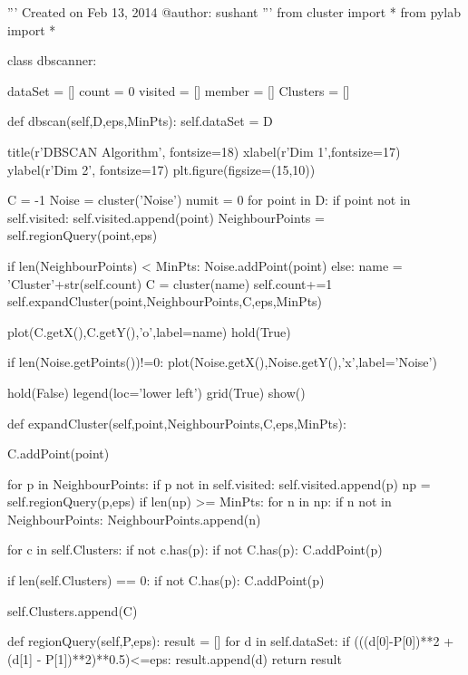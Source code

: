 \documentclass[a4paper, 12pt, spanish]{article}
\renewcommand*{\listalgorithmname}{\'Indice de algoritmos}
\begin{document}
\pagebreak
\begin{python}[caption=DBSCAN]\label{App:DBSCAN}
'''
Created on Feb 13, 2014
@author: sushant
'''
from cluster import *
from pylab import *

class dbscanner:
    
	dataSet = []
	count = 0
	visited = []
	member = []
	Clusters = []
    
	def dbscan(self,D,eps,MinPts):
		self.dataSet = D
        
		title(r'DBSCAN Algorithm', fontsize=18)
		xlabel(r'Dim 1',fontsize=17)
		ylabel(r'Dim 2', fontsize=17)
		plt.figure(figsize=(15,10))
        
		C = -1
		Noise = cluster('Noise')
		numit = 0
		for point in D:
			if point not in self.visited:
				self.visited.append(point)
				NeighbourPoints = self.regionQuery(point,eps)
                
				if len(NeighbourPoints) < MinPts:
					Noise.addPoint(point)
				else:
					name = 'Cluster'+str(self.count)
					C = cluster(name)
					self.count+=1
					self.expandCluster(point,NeighbourPoints,C,eps,MinPts)
                    
					plot(C.getX(),C.getY(),'o',label=name)
					hold(True)

       
		if len(Noise.getPoints())!=0:
			plot(Noise.getX(),Noise.getY(),'x',label='Noise')
            
		hold(False)
		legend(loc='lower left')
		grid(True)
		show()
    
	def expandCluster(self,point,NeighbourPoints,C,eps,MinPts):
        
		C.addPoint(point)
        
		for p in NeighbourPoints:
			if p not in self.visited:
				self.visited.append(p)
				np = self.regionQuery(p,eps)
				if len(np) >= MinPts:
					for n in np:
						if n not in NeighbourPoints:
							NeighbourPoints.append(n)
                    
			for c in self.Clusters:
				if not c.has(p):
					if not C.has(p):
						C.addPoint(p)
                        
			if len(self.Clusters) == 0:
				if not C.has(p):
					C.addPoint(p)
                        
		self.Clusters.append(C)                 
                
                     
	def regionQuery(self,P,eps):
		result = []
		for d in self.dataSet:
			if (((d[0]-P[0])**2 + (d[1] - P[1])**2)**0.5)<=eps:
				result.append(d)
		return result            
    
\end{python}

\newpage
{}
\listoffigures
\addcontentsline{toc}{section}{\listalgorithmname}
\listofalgorithms

\newpage
{}

{}

\end{document}
